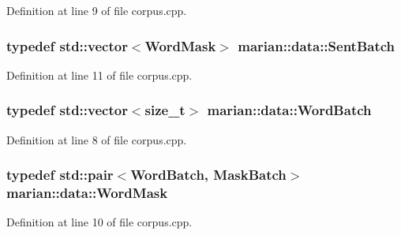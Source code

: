 Definition at line 9 of file corpus.\+cpp.

\subsubsection[{\texorpdfstring{Sent\+Batch}{SentBatch}}]{\setlength{\rightskip}{0pt plus 5cm}typedef std\+::vector$<${\bf Word\+Mask}$>$ {\bf marian\+::data\+::\+Sent\+Batch}}\hypertarget{namespacemarian_1_1data_a85884cce1df2778cb81e08c80c0cd7fe}{}\label{namespacemarian_1_1data_a85884cce1df2778cb81e08c80c0cd7fe}


Definition at line 11 of file corpus.\+cpp.

\subsubsection[{\texorpdfstring{Word\+Batch}{WordBatch}}]{\setlength{\rightskip}{0pt plus 5cm}typedef std\+::vector$<$size\+\_\+t$>$ {\bf marian\+::data\+::\+Word\+Batch}}\hypertarget{namespacemarian_1_1data_ad793aa92c2dc86a1151c32a94f5ed957}{}\label{namespacemarian_1_1data_ad793aa92c2dc86a1151c32a94f5ed957}


Definition at line 8 of file corpus.\+cpp.

\subsubsection[{\texorpdfstring{Word\+Mask}{WordMask}}]{\setlength{\rightskip}{0pt plus 5cm}typedef std\+::pair$<${\bf Word\+Batch}, {\bf Mask\+Batch}$>$ {\bf marian\+::data\+::\+Word\+Mask}}\hypertarget{namespacemarian_1_1data_a34e6120fb1a0a79aff632179a04be607}{}\label{namespacemarian_1_1data_a34e6120fb1a0a79aff632179a04be607}


Definition at line 10 of file corpus.\+cpp.

